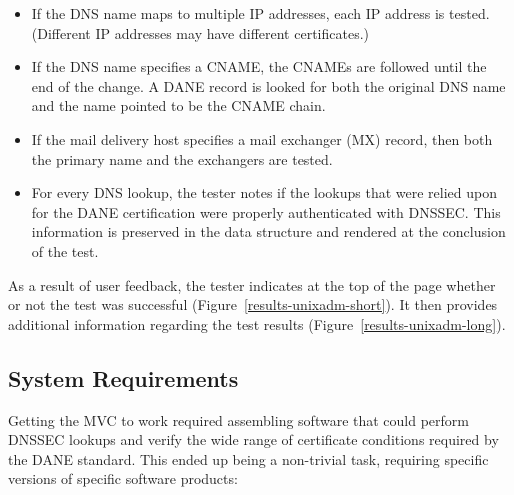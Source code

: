 \documentclass[preprint,3p,11pt]{elsarticle}
\begin{document}
\begin{itemize}
\item If the DNS name maps to multiple IP addresses, each IP address
  is tested. (Different IP addresses may have different certificates.)
\item If the DNS name specifies a CNAME, the CNAMEs are followed until
  the end of the change. A DANE record is looked for both the original
  DNS name and the name pointed to be the CNAME chain.
\item If the mail delivery host specifies a mail exchanger (MX)
  record, then both the primary name and the exchangers are tested.
\item For every DNS lookup, the tester notes if the lookups that were
  relied upon for the DANE certification were
  properly authenticated with DNSSEC. This information is preserved in
  the data structure and rendered at the conclusion of the test. 
\end{itemize}

As a result of user feedback, the tester indicates at the top of the
page whether or not the test was successful (Figure~\ref{results-unixadm-short}). It then provides
additional information regarding the test results (Figure~\ref{results-unixadm-long}).



\subsection{System Requirements}

Getting the MVC to work required assembling software that
could perform DNSSEC lookups and verify the wide range of certificate
conditions required by the DANE standard. This ended up being a
non-trivial task, requiring specific versions of specific software products:
\end{document}
